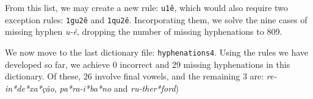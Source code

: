 From this list, we may create a new rule: \texttt{u1ê}, which would also require two exception rules: \texttt{1gu2ê} and \texttt{1qu2ê}.
%
Incorporating them, we solve the nine cases of missing hyphen \emph{u-ê}, dropping the number of missing hyphenations to 809.


We now move to the last dictionary file: \texttt{hyphenations4}. Using the rules we have developed so far,
we achieve 0 incorrect and 29 missing hyphenations in this dictionary. 
Of these, 26 involve final vowels, and the remaining 3 are:
\emph{re-in*de*xa*ção}, \emph{pa*ra-i*ba*no} and \emph{ru-ther*ford})

